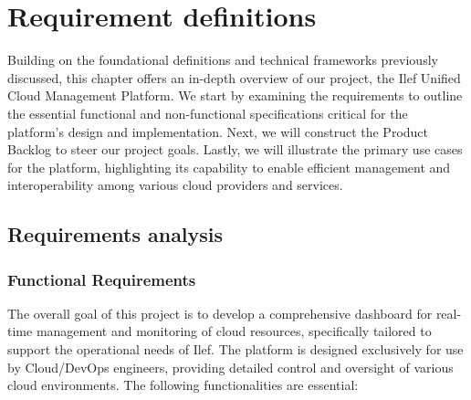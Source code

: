 \chapter{Requirement definitions}

Building on the foundational definitions and technical frameworks previously discussed, this chapter offers an in-depth overview of our project, the Ilef Unified Cloud Management Platform. We start by examining the requirements to outline the essential functional and non-functional specifications critical for the platform’s design and implementation. Next, we will construct the Product Backlog to steer our project goals. Lastly, we will illustrate the primary use cases for the platform, highlighting its capability to enable efficient management and interoperability among various cloud providers and services.


\pagebreak

\section{Requirements analysis}

\subsection{Functional Requirements}
The overall goal of this project is to develop a comprehensive dashboard for real-time management and monitoring of cloud resources, specifically tailored to support the operational needs of Ilef. The platform is designed exclusively for use by Cloud/DevOps engineers, providing detailed control and oversight of various cloud environments. The following functionalities are essential:

